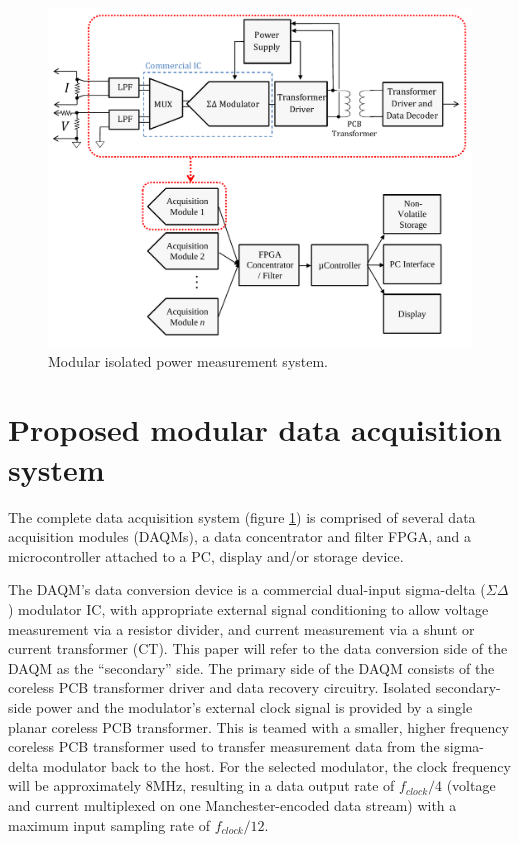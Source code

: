 \documentclass[conference]{IEEEtran}
\begin{document}
\begin{figure}[t]
	\centering
	\includegraphics[width=1.0\columnwidth]{./img/FullSystem_BasicCol}
	\caption{Modular isolated power measurement system.}
	\label{fig:FullSystem}
\end{figure}

\section{Proposed modular data acquisition system}
The complete data acquisition system (figure \ref{fig:FullSystem}) is comprised of several data acquisition modules (DAQMs), a data concentrator and filter FPGA, and a microcontroller attached to a PC, display and/or storage device.

The DAQM's data conversion device is a commercial dual-input sigma-delta ($\Sigma\Delta$) modulator IC, with appropriate external signal conditioning to allow voltage measurement via a resistor divider, and current measurement via a shunt or current transformer (CT).  This paper will refer to the data conversion side of the DAQM as the ``secondary'' side.  The primary side of the DAQM consists of the coreless PCB transformer driver and data recovery circuitry.  Isolated secondary-side power and the modulator's external clock signal is provided by a single planar coreless PCB transformer.  This is teamed with a smaller,  higher frequency coreless PCB transformer used to transfer measurement data from the sigma-delta modulator back to the host.  For the selected modulator, the clock frequency will be approximately 8MHz, resulting in a data output rate of $ f_{clock}/4 $ (voltage and current multiplexed on one Manchester-encoded data stream) with a maximum input sampling rate of $ f_{clock}/12 $.
\end{document}
